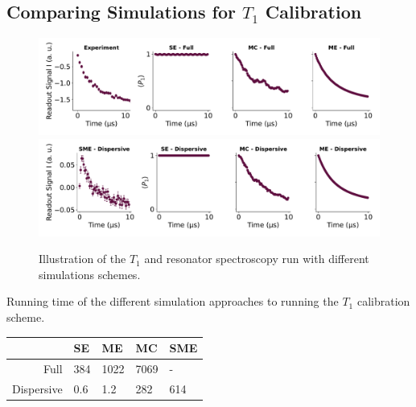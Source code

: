 \subsection{Comparing Simulations for $T_1$ Calibration}
\begin{figure}[t]
    \centering
    \includegraphics[]{Simulations/simulations_of_calibrations/Figs/qubit_T1.pdf}
    \includegraphics[]{Simulations/simulations_of_calibrations/Figs/qubit_T1_dispersive.pdf}
    \caption{Illustration of the $T_1$ and resonator spectroscopy run with different simulations schemes.}
    \label{fig:calibrations_in_simulation}
\end{figure} 
\begin{margintable}
    \caption{Running time of the different simulation approaches to running the $T_1$ calibration scheme.}
    \vspace{0.3 cm}
    \centering
    \begin{tabular}{r|llll}
                    &  SE   & ME    & MC    & SME   \\ \hline 
    Full            & 384   & 1022  & 7069  & -     \\
    Dispersive      & 0.6   & 1.2   & 282     & 614     \\ 
    \end{tabular}
    \label{tab:simulation_t1_running_time}
\end{margintable}
